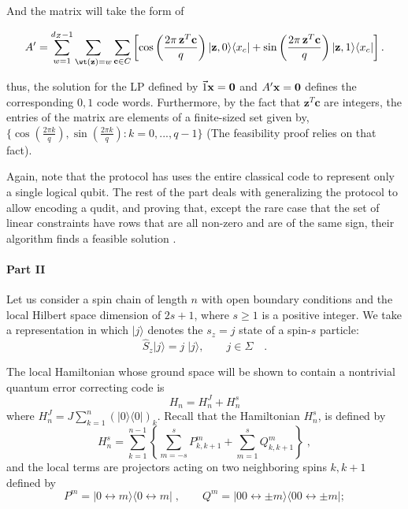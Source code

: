 \documentclass{article}
\begin{document}
And the matrix will take the form of  

\begin{equation}
A'=\sum_{w=1}^{d_Z-1}
\sum_{\wt({\bf z}) = w}
\sum_{{\bf c}\in{C}}
\left[
\cos\left(\frac{2\pi\,{\bf z}^{T}{\bf c}}{q}\right)|{\bf z},0\rangle\langle{x_c}|+
\sin\left(\frac{2\pi\,{\bf z}^{T}{\bf c}}{q}\right)|{\bf z},1\rangle\langle{x_c}|
\right].
 \label{eq:Aprime}
\end{equation} 

thus, the solution for the LP defined by \( \vec{1}\bf x = 0 \) and  \( A^\prime  \bf x = 0 \) defines the corresponding \(0,1\) code words. Furthermore, by the fact that \( \mathbf{z}^T\mathbf{c}\) are integers, the entries of the matrix are elements of a finite-sized set given by, \( \{\cos(\frac{2\pi k}{q}) , \sin(\frac{2\pi k}{q}) : k = 0, . . . , q - 1 \}\) (The feasibility proof relies on that fact).   

Again, note that the protocol has uses the entire classical code to represent only a single logical qubit. The rest of the part deals with generalizing the protocol to allow encoding a qudit, and proving that, except the rare case that the set of linear constraints have rows that are all non-zero and are of the same sign, their algorithm finds a feasible solution . 


\paragraph{Part II}

Let us consider a spin chain of length
$n$ with open boundary conditions and the local Hilbert space dimension of $2s+1$, where $s\ge1$
is a positive integer. We take a representation in which $|j\rangle$
denotes the $s_{z}=j$ state of a spin-$s$ particle:
\[
\hat{S}_{z}|j\rangle=j\;|j\rangle,\qquad j\in\Sigma\quad.
\]

The local Hamiltonian whose ground space will be shown to contain a nontrivial quantum
error correcting code is
\begin{equation}
H_{n}=H_{n}^{J}+H_{n}^{s}\label{eq:H}
\end{equation}
where \(H_{n}^{J}=J\sum_{k=1}^{n}\left(|0\rangle\langle0|\right)_{k}\).
Recall that the Hamiltonian \(H_{n}^{s}\), is defined by
\begin{equation}
H_{n}^{s}=\sum_{k=1}^{n-1}\left\{ \sum_{m=-s}^{s}P_{k,k+1}^{m}+\sum_{m=1}^{s}Q_{k,k+1}^{m}\right\} \;,\label{eq:Hn_s-2}
\end{equation}
and the local terms are projectors acting on two neighboring spins \(k,k+1\) defined by 
\begin{equation}
P^{m}=|0\leftrightarrow m\rangle\langle0\leftrightarrow m|\;,\qquad Q^{m}=|00\leftrightarrow\pm m\rangle\langle00\leftrightarrow\pm m|;\label{eq:hs_Proj}
\end{equation}
\end{document}
